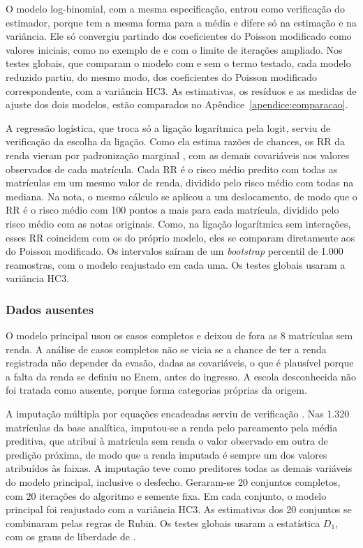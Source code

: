 \documentclass[12pt,a4paper]{article}
\begin{document}
O modelo log-binomial, com a mesma especificação, entrou como verificação do estimador, porque tem a mesma forma para a média e difere só na estimação e na variância. Ele só convergiu partindo dos coeficientes do Poisson modificado como valores iniciais, como no exemplo de \citet{zou2004modified} e com o limite de iterações ampliado. Nos testes globais, que comparam o modelo com e sem o termo testado, cada modelo reduzido partiu, do mesmo modo, dos coeficientes do Poisson modificado correspondente, com a variância HC3. As estimativas, os resíduos e as medidas de ajuste dos dois modelos, estão comparados no Apêndice~\ref{apendice:comparacao}.

A regressão logística, que troca só a ligação logarítmica pela logit, serviu de verificação da escolha da ligação. Como ela estima razões de chances, os RR da renda vieram por padronização marginal \citep{muller2014estimating}, com as demais covariáveis nos valores observados de cada matrícula. Cada RR é o risco médio predito com todas as matrículas em um mesmo valor de renda, dividido pelo risco médio com todas na mediana. Na nota, o mesmo cálculo se aplicou a um deslocamento, de modo que o RR é o risco médio com 100 pontos a mais para cada matrícula, dividido pelo risco médio com as notas originais. Como, na ligação logarítmica sem interações, esses RR coincidem com os do próprio modelo, eles se comparam diretamente aos do Poisson modificado. Os intervalos saíram de um \textit{bootstrap} percentil de 1.000 reamostras, com o modelo reajustado em cada uma. Os testes globais usaram a variância HC3.

\subsubsection{Dados ausentes}
\label{sec:ausentes}

O modelo principal usou os casos completos e deixou de fora as 8 matrículas sem renda. A análise de casos completos não se vicia se a chance de ter a renda registrada não depender da evasão, dadas as covariáveis, o que é plausível porque a falta da renda se definiu no Enem, antes do ingresso. A escola desconhecida não foi tratada como ausente, porque forma categorias próprias da origem.

A imputação múltipla por equações encadeadas serviu de verificação \citep{vanbuuren2011mice}. Nas 1.320 matrículas da base analítica, imputou-se a renda pelo pareamento pela média preditiva, que atribui à matrícula sem renda o valor observado em outra de predição próxima, de modo que a renda imputada é sempre um dos valores atribuídos às faixas. A imputação teve como preditores todas as demais variáveis do modelo principal, inclusive o desfecho. Geraram-se 20 conjuntos completos, com 20 iterações do algoritmo e semente fixa. Em cada conjunto, o modelo principal foi reajustado com a variância HC3. As estimativas dos 20 conjuntos se combinaram pelas regras de Rubin. Os testes globais usaram a estatística $D_1$, com os graus de liberdade de \citet{li1991large}.
\end{document}

